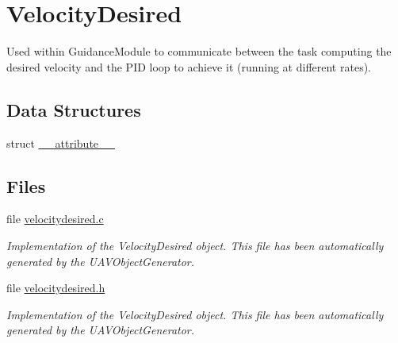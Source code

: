 \hypertarget{group___velocity_desired}{\section{\-Velocity\-Desired}
\label{group___velocity_desired}
}


\-Used within \-Guidance\-Module to communicate between the task computing the desired velocity and the \-P\-I\-D loop to achieve it (running at different rates).  


\subsection*{\-Data \-Structures}
\begin{DoxyCompactItemize}
\item 
struct \hyperlink{struct____attribute____}{\-\_\-\-\_\-attribute\-\_\-\-\_\-}
\end{DoxyCompactItemize}
\subsection*{\-Files}
\begin{DoxyCompactItemize}
\item 
file \hyperlink{velocitydesired_8c}{velocitydesired.\-c}
\begin{DoxyCompactList}\small\item\em \-Implementation of the \-Velocity\-Desired object. \-This file has been automatically generated by the \-U\-A\-V\-Object\-Generator. \end{DoxyCompactList}\item 
file \hyperlink{velocitydesired_8h}{velocitydesired.\-h}
\begin{DoxyCompactList}\small\item\em \-Implementation of the \-Velocity\-Desired object. \-This file has been automatically generated by the \-U\-A\-V\-Object\-Generator. \end{DoxyCompactList}\end{DoxyCompactItemize}

